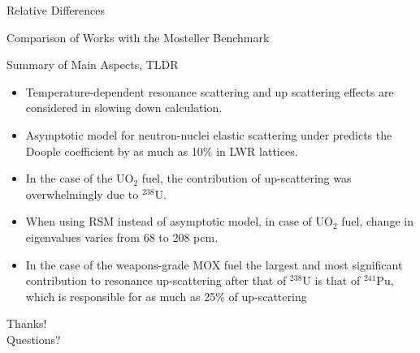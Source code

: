 \documentclass[sans,mathserif,aspectratio=169]{beamer}
\begin{document}
\begin{frame}{Relative Differences}
\centering
{}
\end{frame}

\begin{frame}{Comparison of Works with the Mosteller Benchmark}
\centering
{}
\end{frame}

\begin{frame}{Summary of Main Aspects, TLDR}
\begin{itemize}
\item Temperature-dependent resonance scattering and up scattering effects are considered in slowing down calculation. \pause
\item Asymptotic model for neutron-nuclei elastic scattering under predicts the Doople coefficient by as much as 10\% in LWR lattices. \pause
\item In the case of the UO$_2$ fuel, the contribution of up-scattering was overwhelmingly due to $^{238}$U. \pause
\item When using RSM instead of asymptotic model, in case of UO$_2$ fuel, change in eigenvalues varies from 68 to 208 pcm.\pause
\item In the case of the weapons-grade MOX fuel the largest and most significant contribution to resonance up-scattering after that of $^{238}$U is that of $^{241}$Pu, which is responsible for as much as 25\% of up-scattering
\end{itemize}
\end{frame}

\begin{frame}
\centering
\Huge
Thanks! \\
Questions?
\end{frame}
\end{document}
